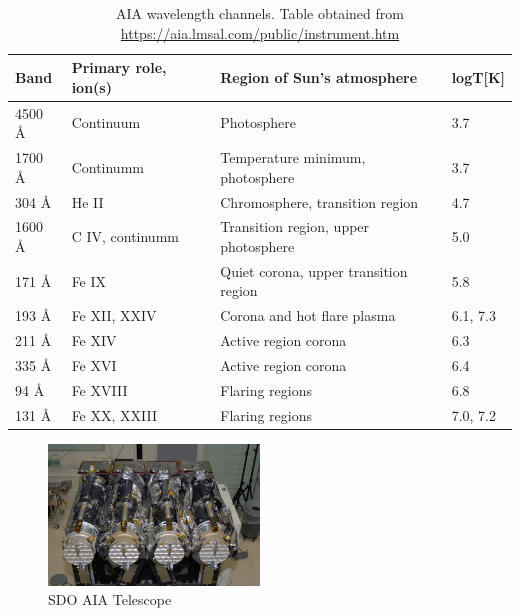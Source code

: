 \message{ !name(main.tex)}\documentclass[12pt]{article}
\begin{document}
\begin{table}[h!]
    \centering
      \setlength{\tabcolsep}{10pt}
      \renewcommand{\arraystretch}{1.5}
    \begin{tabular}{| l | l | l | l |}
      \hline
       \textbf{Band} & \textbf{Primary role, ion(s)} & \textbf{Region of Sun's atmosphere} & \textbf{logT{[}K{]}} \\
      \hline
      4500 Å & Continuum            & Photosphere                                            & 3.7                                   \\
      \hline
      1700 Å & Continumm            & Temperature minimum, photosphere                       & 3.7                                   \\
      \hline
      304 Å  & He II                & Chromosphere, transition region                        & 4.7                                   \\
      \hline
      1600 Å & C IV, continumm      & Transition region, upper photosphere                   & 5.0                                   \\
      \hline
      171 Å  & Fe IX                & Quiet corona, upper transition region                  & 5.8                                   \\
      \hline
      193 Å  & Fe XII, XXIV         & Corona and hot flare plasma                            & 6.1, 7.3                              \\
      \hline
      211 Å  & Fe XIV               & Active region corona                                   & 6.3                                   \\
      \hline
      335 Å  & Fe XVI               & Active region corona                                   & 6.4                                   \\
      \hline
      94 Å   & Fe XVIII             & Flaring regions                                        & 6.8                                   \\
      \hline
      131 Å  & Fe XX, XXIII         & Flaring regions                                        & 7.0, 7.2                              \\
      \hline
    \end{tabular}
    \caption{AIA wavelength channels. Table obtained from \url{https://aia.lmsal.com/public/instrument.htm}}
    \label{tab:aia_wav_channels}
\end{table}

\begin{figure}[h!]
    \centering
    \includegraphics[width=0.5\textwidth]{images/SDO AIA Telescopes.jpg}
    \caption[AIA Telescopes]{SDO AIA Telescope }
    \label{fig:aia_telescopes}
\end{figure}
\end{document}
